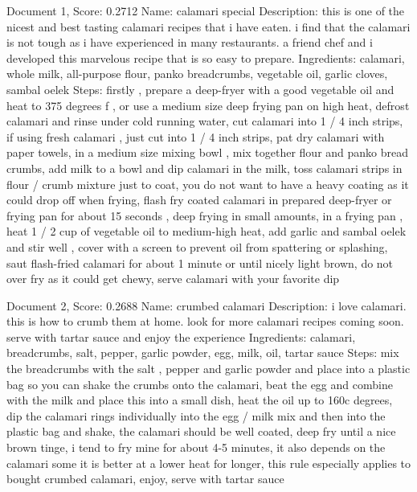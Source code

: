 \documentclass[a4paper,11pt]{article}
\begin{document}
Document 1, Score: 0.2712
Name: calamari special
Description: this is one of the nicest and best tasting calamari recipes that i have eaten. i find that the calamari is not tough as i have experienced in many restaurants. a friend chef and i developed this marvelous recipe that is so easy to prepare.
Ingredients: calamari, whole milk, all-purpose flour, panko breadcrumbs, vegetable oil, garlic cloves, sambal oelek
Steps: firstly , prepare a deep-fryer with a good vegetable oil and heat to 375 degrees f , or use a medium size deep frying pan on high heat, defrost calamari and rinse under cold running water, cut calamari into 1 / 4 inch strips, if using fresh calamari , just cut into 1 / 4 inch strips, pat dry calamari with paper towels, in a medium size mixing bowl , mix together flour and panko bread crumbs, add milk to a bowl and dip calamari in the milk, toss calamari strips in flour / crumb mixture just to coat, you do not want to have a heavy coating as it could drop off when frying, flash fry coated calamari in prepared deep-fryer or frying pan for about 15 seconds , deep frying in small amounts, in a frying pan , heat 1 / 2 cup of vegetable oil to medium-high heat, add garlic and sambal oelek and stir well , cover with a screen to prevent oil from spattering or splashing, saut flash-fried calamari for about 1 minute or until nicely light brown, do not over fry as it could get chewy, serve calamari with your favorite dip

Document 2, Score: 0.2688
Name: crumbed calamari
Description: i love calamari. this is how to crumb them at home. look for more calamari recipes coming soon. serve with tartar sauce and enjoy the experience
Ingredients: calamari, breadcrumbs, salt, pepper, garlic powder, egg, milk, oil, tartar sauce
Steps: mix the breadcrumbs with the salt , pepper and garlic powder and place into a plastic bag so you can shake the crumbs onto the calamari, beat the egg and combine with the milk and place this into a small dish, heat the oil up to 160c degrees, dip the calamari rings individually into the egg / milk mix and then into the plastic bag and shake, the calamari should be well coated, deep fry until a nice brown tinge, i tend to fry mine for about 4-5 minutes, it also depends on the calamari some it is better at a lower heat for longer, this rule especially applies to bought crumbed calamari, enjoy, serve with tartar sauce
\end{document}
